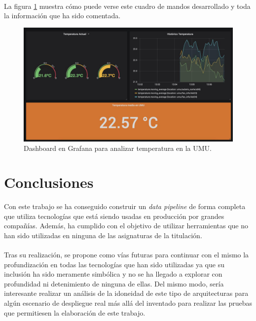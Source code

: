 \documentclass[12pt, a4paper]{article}
\begin{document}
        \paragraph{}
        La figura \ref{fig-dashboard} muestra cómo puede verse este cuadro de mandos desarrollado y toda la información que ha sido comentada.

        \begin{figure}[ht]
            \centerline{\includegraphics[width=0.8\paperwidth]{dashboard}}
            \caption{Dashboard en Grafana para analizar temperatura en la UMU.}
            \label{fig-dashboard}
        \end{figure}

        \section{Conclusiones}

        \paragraph{}
        Con este trabajo se ha conseguido construir un \textit{data pipeline} de forma completa que utiliza tecnologías que está siendo usadas en producción por grandes compañías. Además, ha cumplido con el objetivo de utilizar herramientas que no han sido utilizadas en ninguna de las asignaturas de la titulación.

        \paragraph{}
        Tras su realización, se propone como vías futuras para continuar con el mismo la profundización en todas las tecnologías que han sido utilizadas ya que su inclusión ha sido meramente simbólica y no se ha llegado a explorar con profundidad ni detenimiento de ninguna de ellas. Del mismo modo, sería interesante realizar un análisis de la idoneidad de este tipo de arquitecturas para algún escenario de despliegue real más allá del inventado para realizar las pruebas que permitiesen la elaboración de este trabajo.
\end{document}
